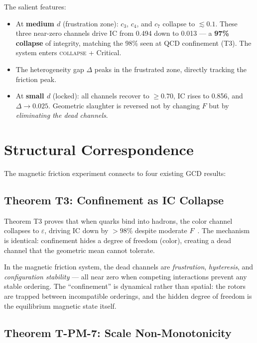 \documentclass[
  aps,
  prd,
  twocolumn,
  superscriptaddress,
  nofootinbib,
  floatfix
]{revtex4-2}
\newcommand{\eps}{\varepsilon}
\newcommand{\regime}[1]{\textrm{\upshape\scshape#1}}
\newcommand{\IC}{\mathrm{IC}}
\begin{document}
The salient features:
\begin{itemize}[nosep]
  \item At \textbf{medium $d$} (frustration zone):
    $c_3$, $c_4$, and $c_7$ collapse to $\lesssim 0.1$.
    These three near-zero channels drive $\IC$ from 0.494
    down to 0.013 --- a \textbf{97\% collapse} of integrity,
    matching the 98\% seen at QCD confinement (T3).
    The system enters \regime{collapse} + Critical.
  \item The heterogeneity gap $\Delta$ peaks in the
    frustrated zone, directly tracking the friction peak.
  \item At \textbf{small $d$} (locked): all channels recover
    to $\geq 0.70$, $\IC$ rises to 0.856, and
    $\Delta \to 0.025$.  Geometric slaughter is reversed
    not by changing $F$ but by \emph{eliminating the
    dead channels}.
\end{itemize}

\section{Structural Correspondence}\label{sec:structure}

The magnetic friction experiment connects to four
existing GCD results:

\subsection{Theorem T3: Confinement as IC Collapse}

Theorem T3 proves that when quarks bind into hadrons,
the color channel collapses to $\eps$, driving $\IC$
down by $>98\%$ despite moderate $F$~\cite{paulus2025physicscoherence}.
The mechanism is identical: confinement hides a degree
of freedom (color), creating a dead channel that
the geometric mean cannot tolerate.

In the magnetic friction system, the dead channels are
\emph{frustration}, \emph{hysteresis}, and
\emph{configuration stability} --- all near zero when
competing interactions prevent any stable ordering.
The ``confinement'' is dynamical rather than spatial:
the rotors are trapped between incompatible orderings,
and the hidden degree of freedom is the equilibrium
magnetic state itself.

\subsection{Theorem T-PM-7: Scale Non-Monotonicity}
\end{document}
